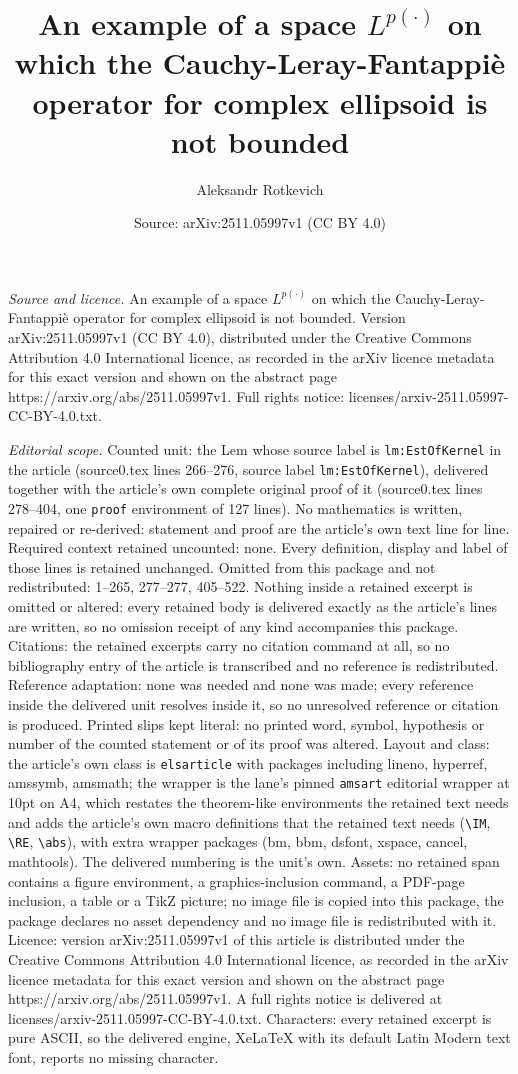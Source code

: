 \documentclass[10pt,a4paper]{amsart}
\title[An example of a space $L^{p(\cdot)}$ on which the Cauchy-Ler]{An example of a space $L^{p(\cdot)}$ on which the Cauchy-Leray-Fantappi\`{e} operator for complex ellipsoid is not bounded}
\author{Aleksandr Rotkevich}
\date{Source: arXiv:2511.05997v1 (CC BY 4.0)}
\begin{document}
\maketitle

\noindent\emph{Source and licence.} An example of a space $L^{p(\cdot)}$ on which the Cauchy-Leray-Fantappi\`{e} operator for complex ellipsoid is not bounded. Version arXiv:2511.05997v1 (CC BY 4.0), distributed under the Creative Commons Attribution 4.0 International licence, as recorded in the arXiv licence metadata for this exact version and shown on the abstract page https://arxiv.org/abs/2511.05997v1. Full rights notice: licenses/arxiv-2511.05997-CC-BY-4.0.txt.\par\smallskip

\noindent\textit{Editorial scope.} Counted unit: the Lem whose source label is \texttt{lm:EstOfKernel} in the article (source0.tex lines 266--276, source label \texttt{lm:EstOfKernel}), delivered together with the article's own complete original proof of it (source0.tex lines 278--404, one \texttt{proof} environment of 127 lines). No mathematics is written, repaired or re-derived: statement and proof are the article's own text line for line. Required context retained uncounted: none. Every definition, display and label of those lines is retained unchanged. Omitted from this package and not redistributed: 1--265, 277--277, 405--522. Nothing inside a retained excerpt is omitted or altered: every retained body is delivered exactly as the article's lines are written, so no omission receipt of any kind accompanies this package. Citations: the retained excerpts carry no citation command at all, so no bibliography entry of the article is transcribed and no reference is redistributed. Reference adaptation: none was needed and none was made; every reference inside the delivered unit resolves inside it, so no unresolved reference or citation is produced. Printed slips kept literal: no printed word, symbol, hypothesis or number of the counted statement or of its proof was altered. Layout and class: the article's own class is \texttt{elsarticle} with packages including lineno, hyperref, amssymb, amsmath; the wrapper is the lane's pinned \texttt{amsart} editorial wrapper at 10pt on A4, which restates the theorem-like environments the retained text needs and adds the article's own macro definitions that the retained text needs (\texttt{\textbackslash IM}, \texttt{\textbackslash RE}, \texttt{\textbackslash abs}), with extra wrapper packages (bm, bbm, dsfont, xspace, cancel, mathtools). The delivered numbering is the unit's own. Assets: no retained span contains a figure environment, a graphics-inclusion command, a PDF-page inclusion, a table or a TikZ picture; no image file is copied into this package, the package declares no asset dependency and no image file is redistributed with it. Licence: version arXiv:2511.05997v1 of this article is distributed under the Creative Commons Attribution 4.0 International licence, as recorded in the arXiv licence metadata for this exact version and shown on the abstract page https://arxiv.org/abs/2511.05997v1. A full rights notice is delivered at licenses/arxiv-2511.05997-CC-BY-4.0.txt. Characters: every retained excerpt is pure ASCII, so the delivered engine, XeLaTeX with its default Latin Modern text font, reports no missing character.
\end{document}
